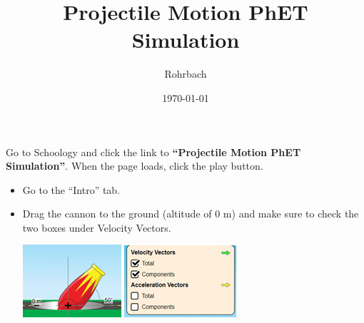 \documentclass[10pt]{exam}
\title{Projectile Motion PhET Simulation}
\author{Rohrbach}
\date{\today}
\begin{document}
\maketitle

\noindent
Go to Schoology and click the link to {\bf ``Projectile Motion PhET Simulation''}.  When the page loads, click the play button.

\begin{itemize}
  \item Go to the ``Intro'' tab.
  \item Drag the cannon to the ground (altitude of 0 m)	and make sure to check the two boxes under Velocity Vectors.
  
  \includegraphics{cannon.png} \includegraphics{checkboxes.png}

\end{itemize}
\end{document}
